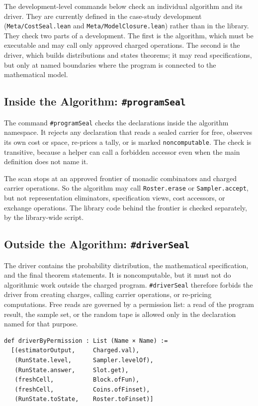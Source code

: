 \documentclass[acmsmall,nonacm]{acmart}
\begin{document}
The development-level commands below check an individual algorithm and its driver.
They are currently defined in the case-study development (\lstinline{Meta/CostSeal.lean} and \lstinline{Meta/ModelClosure.lean}) rather than in the library.
They check two parts of a development.
The first is the algorithm, which must be executable and may call only approved charged operations.
The second is the driver, which builds distributions and states theorems; it may read specifications, but only at named boundaries where the program is connected to the mathematical model.

\subsection{Inside the Algorithm: \texttt{\#programSeal}}\label{sec:programseal}

The command \lstinline{#programSeal} checks the declarations inside the algorithm namespace.
It rejects any declaration that reads a sealed carrier for free, observes its own cost or space, re-prices a tally, or is marked \lstinline{noncomputable}.
The check is transitive, because a helper can call a forbidden accessor even when the main definition does not name it.

The scan stops at an approved frontier of monadic combinators and charged carrier operations.
So the algorithm may call \lstinline{Roster.erase} or \lstinline{Sampler.accept}, but not representation eliminators, specification views, cost accessors, or exchange operations.
The library code behind the frontier is checked separately, by the library-wide script.

\subsection{Outside the Algorithm: \texttt{\#driverSeal}}\label{sec:driverseal}

The driver contains the probability distribution, the mathematical specification, and the final theorem statements.
It is noncomputable, but it must not do algorithmic work outside the charged program.
\lstinline{#driverSeal} therefore forbids the driver from creating charges, calling carrier operations, or re-pricing computations.
Free reads are governed by a permission list: a read of the program result, the sample set, or the random tape is allowed only in the declaration named for that purpose.

\begin{lstlisting}
def driverByPermission : List (Name × Name) :=
  [(estimatorOutput,     Charged.val),
   (RunState.level,      Sampler.levelOf),
   (RunState.answer,     Slot.get),
   (freshCell,           Block.ofFun),
   (freshCell,           Coins.ofFinset),
   (RunState.toState,    Roster.toFinset)]
\end{lstlisting}
\end{document}
